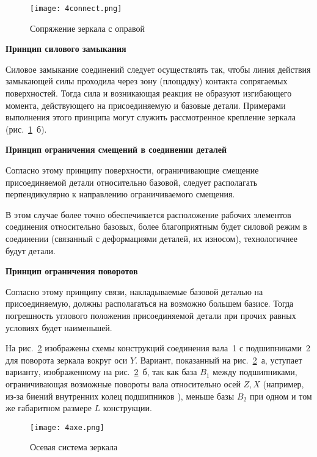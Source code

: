 \begin{figure}[H]
	\caption{Сопряжение зеркала с оправой}
	\texttt{[image: 4connect.png]}
	\label{pic:4connect}
\end{figure}

\begin{flushleft}
\textbf{Принцип силового замыкания}
\end{flushleft}

Силовое замыкание соединений следует осуществлять так, чтобы линия действия замыкающей силы проходила через зону (площадку) контакта сопрягаемых поверхностей. Тогда сила и возникающая реакция не образуют изгибающего момента, действующего на присоединяемую и базовые детали. Примерами выполнения этого принципа могут служить рассмотренное крепление зеркала (рис.~\ref{pic:4connect}~б).

\begin{flushleft}
\textbf{Принцип ограничения смещений в соединении деталей}
\end{flushleft}

Согласно этому принципу поверхности, ограничивающие смещение присоединяемой детали относительно базовой, следует располагать перпендикулярно к направлению ограничиваемого смещения.

В этом случае более точно обеспечивается расположение рабочих элементов соединения относительно базовых, более благоприятным будет силовой режим в соединении (связанный с деформациями деталей, их износом), технологичнее будут детали.

\begin{flushleft}
\textbf{Принцип ограничения поворотов}
\end{flushleft}

Согласно этому принципу связи, накладываемые базовой деталью на присоединяемую, должны располагаться на возможно большем базисе. Тогда погрешность углового положения присоединяемой детали при прочих равных условиях будет наименьшей.

На рис.~\ref{pic:4axe} изображены схемы конструкций соединения вала~1 с подшипниками~2 для поворота зеркала вокруг оси $ Y $. Вариант, показанный на рис.~\ref{pic:4axe}~а, уступает варианту, изображенному на рис.~\ref{pic:4axe}~б, так как база $ B_1 $ между подшипниками, ограничивающая возможные повороты вала относительно осей $ Z, X $ (например, из-за биений   внутренних колец подшипников  ), меньше базы $ B_2 $ при одном и том же габаритном размере $ L $ конструкции.

\begin{figure}[H]
	\caption{Осевая система зеркала}
	\texttt{[image: 4axe.png]}
	\label{pic:4axe}
\end{figure}

